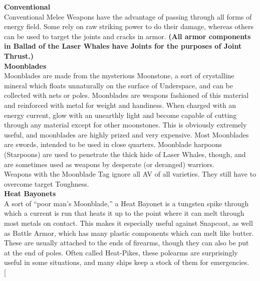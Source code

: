 \documentclass[a4paper, twocolumn, openany]{book}
\begin{document}
{{\bfseries Conventional\\}
Conventional Melee Weapons have the advantage of passing through all forms of energy field.
Some rely on raw striking power to do their damage, whereas others can be used to target the
joints and cracks in armor. {\bfseries (All armor components in Ballad of the Laser Whales have
Joints for the purposes of Joint Thrust.)}\\

{\bfseries Moonblades\\}
Moonblades are made from the mysterious Moonstone, a sort of crystalline mineral which floats
unnaturally on the surface of Underspace, and can be collected with nets or poles. Moonblades
are weapons fashioned of this material and reinforced with metal for weight and handiness.
When charged with an energy current, glow with an unearthly light and become capable of
cutting through any material except for other moonstones. This is obviously extremely useful,
and moonblades are highly prized and very expensive. Most Moonblades are swords, intended
to be used in close quarters. Moonblade harpoons (Starpoons) are used to penetrate the thick
hide of Laser Whales, though, and are sometimes used as weapons by desperate (or deranged)
warriors.\\
Weapons with the Moonblade Tag ignore all AV of all varieties. They still have to overcome
target Toughness.\\

{\bfseries Heat Bayonets\\}
A sort of “poor man’s Moonblade,” a Heat Bayonet is a tungsten spike through which a current
is run that heats it up to the point where it can melt through most metals on contact. This makes
it especially useful against Snapcoat, as well as Battle Armor, which has many plastic
components which can melt like butter. These are usually attached to the ends of firearms,
though they can also be put at the end of poles. Often called Heat-Pikes, these polearms are
surprisingly useful in some situations, and many ships keep a stock of them for emergencies.\\

\twocolumn[{

}}
\end{document}

